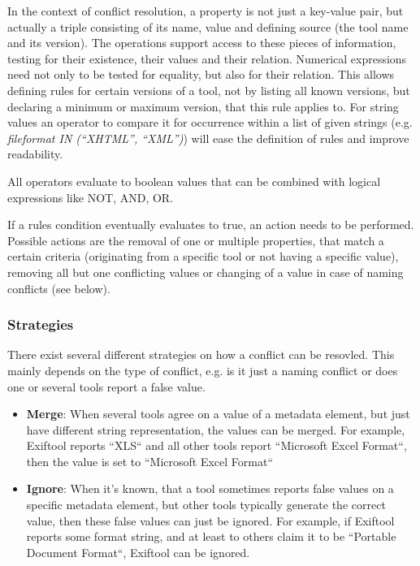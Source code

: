 \documentclass[a4paper,12pt]{article}
\begin{document}
In the context of conflict resolution, a property is not just a key-value pair, but actually a triple consisting of its name, value and defining source (the tool name and its version). The operations support access to these pieces of information, testing for their existence, their values and their relation. Numerical expressions need not only to be tested for equality, but also for their relation. This allows defining rules for certain versions of a tool, not by listing all known versions, but declaring a minimum or maximum version, that this rule applies to. For string values an operator to compare it for occurrence within a list of given strings (e.g. \emph{fileformat IN (``XHTML'', ``XML'')}) will ease the definition of rules and improve readability.

All operators evaluate to boolean values that can be combined with logical expressions like NOT, AND, OR.

If a rules condition eventually evaluates to true, an action needs to be performed. Possible actions are the removal of one or multiple properties, that match a certain criteria (originating from a specific tool or not having a specific value), removing all but one conflicting values or changing of a value in case of naming conflicts (see below). 

\subsubsection{Strategies}

There exist several different strategies on how a conflict can be resovled. This mainly depends on the type of conflict, e.g. is it just a naming conflict or does one or several tools report a false value.

\begin{itemize}
\item \textbf{Merge}: When several tools agree on a value of a metadata element, but just have different string representation, the values can be merged. For example, Exiftool reports ``XLS`` and all other tools report ``Microsoft Excel Format``, then the value is set to ``Microsoft Excel Format``
\item \textbf{Ignore}: When it's known, that a tool sometimes reports false values on a specific metadata element, but other tools typically generate the correct value, then these false values can just be ignored. For example, if Exiftool reports some format string, and at least to others claim it to be ``Portable Document Format``, Exiftool can be ignored.

\end{itemize}
\end{document}
